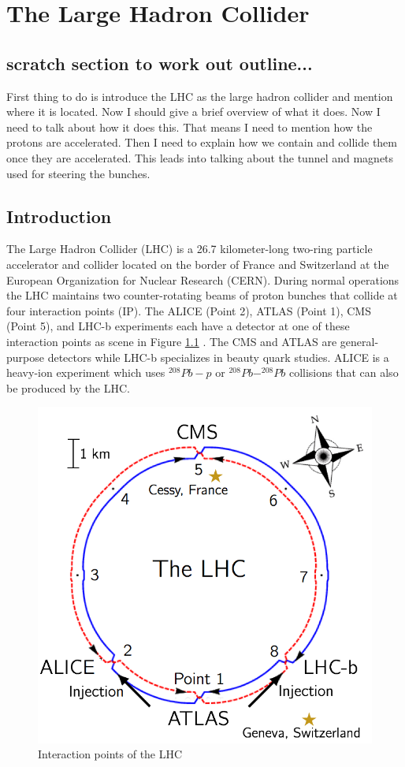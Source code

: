 \chapter{The Large Hadron Collider}

\section{scratch section to work out outline...}
First thing to do is introduce the LHC as the large hadron collider and mention where it is located.  Now I should give a brief overview of what it does.  Now I need to talk about how it does this.  That means I need to mention how the protons are accelerated.  Then I need to explain how we contain and collide them once they are accelerated.  This leads into talking about the tunnel and magnets used for steering the bunches.

\section{Introduction}
The Large Hadron Collider (LHC) is a 26.7 kilometer-long two-ring particle accelerator and collider located on the border of France and Switzerland at the European Organization for Nuclear Research (CERN).  During normal operations the LHC maintains two counter-rotating beams of proton bunches that collide at four interaction points (IP).  The ALICE (Point 2), ATLAS (Point 1), CMS (Point 5), and LHC-b experiments each have a detector at one of these interaction points as scene in Figure \ref{fig:lhcips} .  The CMS and ATLAS are general-purpose detectors while LHC-b specializes in beauty quark studies.  ALICE is a heavy-ion experiment which uses $^{208}Pb-p$ or $^{208}Pb-^{208}Pb$ collisions that can also be produced by the LHC.

\begin{figure}[h]
	\centering
	\includegraphics[width=0.7\linewidth]{Figures/LHC_IPs}
	\caption[LHC interaction points]{Interaction points of the LHC}
	\label{fig:lhcips}
\end{figure}


